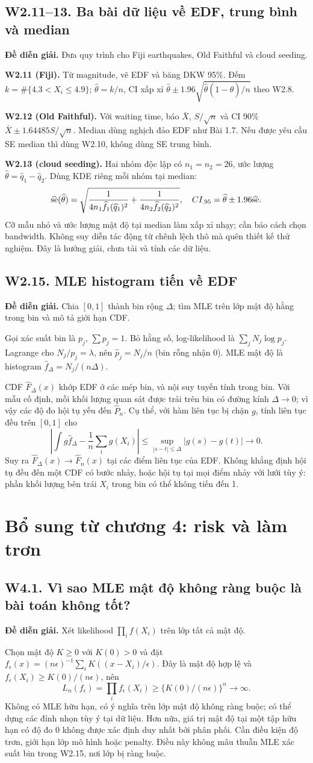 \documentclass[11pt,a4paper]{article}
\newcommand{\Fh}{\widehat F_n}\newcommand{\fh}{\widehat f_h}
\newcommand{\supp}[3]{\subsection{#1. #2}\label{s:#1}\textbf{Đề diễn giải.} #3\par}
\begin{document}
\supp{W2.11--13}{Ba bài dữ liệu về EDF, trung bình và median}{Đưa quy trình cho Fiji earthquakes, Old Faithful và cloud seeding.}
\textbf{W2.11 (Fiji).} Từ magnitude, vẽ EDF và băng DKW 95\%. Đếm $k=\#\{4.3<X_i\le4.9\}$; $\widehat\theta=k/n$, CI xấp xỉ $\widehat\theta\pm1.96\sqrt{\widehat\theta(1-\widehat\theta)/n}$ theo W2.8.

\textbf{W2.12 (Old Faithful).} Với waiting time, báo $\bar X$, $S/\sqrt n$ và CI 90\% $\bar X\pm1.64485S/\sqrt n$. Median dùng nghịch đảo EDF như Bài 1.7. Nếu được yêu cầu SE median thì dùng W2.10, không dùng SE trung bình.

\textbf{W2.13 (cloud seeding).} Hai nhóm độc lập có $n_1=n_2=26$, ước lượng $\widehat\theta=\widehat q_1-\widehat q_2$. Dùng KDE riêng mỗi nhóm tại median:
\[
\widehat{\operatorname{se}}(\widehat\theta)=\sqrt{\frac1{4n_1\widehat f_1(\widehat q_1)^2}+\frac1{4n_2\widehat f_2(\widehat q_2)^2}},\quad
CI_{.95}=\widehat\theta\pm1.96\widehat{\operatorname{se}}.
\]
Cỡ mẫu nhỏ và ước lượng mật độ tại median làm xấp xỉ nhạy; cần báo cách chọn bandwidth. Không suy diễn tác động từ chênh lệch thô mà quên thiết kế thử nghiệm. Đây là hướng giải, chưa tải và tính các dữ liệu.

\supp{W2.15}{MLE histogram tiến về EDF}{Chia $[0,1]$ thành bin rộng $\Delta$; tìm MLE trên lớp mật độ hằng trong bin và mô tả giới hạn CDF.}
Gọi xác suất bin là $p_j$, $\sum p_j=1$. Bỏ hằng số, log-likelihood là $\sum_jN_j\log p_j$. Lagrange cho $N_j/p_j=\lambda$, nên $\widehat p_j=N_j/n$ (bin rỗng nhận 0). MLE mật độ là histogram $\widehat f_\Delta=N_j/(n\Delta)$.

CDF $\widehat F_\Delta(x)$ khớp EDF ở các mép bin, và nội suy tuyến tính trong bin. Với mẫu cố định, mỗi khối lượng quan sát được trải trên bin có đường kính $\Delta\to0$; vì vậy các độ đo hội tụ yếu đến $\widehat P_n$. Cụ thể, với hàm liên tục bị chặn $g$, tính liên tục đều trên $[0,1]$ cho
\[
\left|\int g\widehat f_\Delta-\frac1n\sum_i g(X_i)\right|
\le\sup_{|s-t|\le\Delta}|g(s)-g(t)|\to0.
\]
Suy ra $\widehat F_\Delta(x)\to\Fh(x)$ tại các điểm liên tục của EDF. Không khẳng định hội tụ đều đến một CDF có bước nhảy, hoặc hội tụ tại mọi điểm nhảy với lưới tùy ý: phần khối lượng bên trái $X_i$ trong bin có thể không tiến đến 1.
\section{Bổ sung từ chương 4: risk và làm trơn}
\supp{W4.1}{Vì sao MLE mật độ không ràng buộc là bài toán không tốt?}{Xét likelihood $\prod_i f(X_i)$ trên lớp tất cả mật độ.}
Chọn mật độ $K\ge0$ với $K(0)>0$ và đặt $f_\epsilon(x)=(n\epsilon)^{-1}\sum_iK((x-X_i)/\epsilon)$. Đây là mật độ hợp lệ và
$f_\epsilon(X_i)\ge K(0)/(n\epsilon)$, nên
\[
L_n(f_\epsilon)=\prod_i f_\epsilon(X_i)\ge\{K(0)/(n\epsilon)\}^n\longrightarrow\infty.
\]
Không có MLE hữu hạn, có ý nghĩa trên lớp mật độ không ràng buộc; có thể dựng các đỉnh nhọn tùy ý tại dữ liệu. Hơn nữa, giá trị mật độ tại một tập hữu hạn có độ đo 0 không được xác định duy nhất bởi phân phối. Cần điều kiện độ trơn, giới hạn lớp mô hình hoặc penalty. Điều này không mâu thuẫn MLE xác suất bin trong W2.15, nơi lớp bị ràng buộc.
\end{document}

